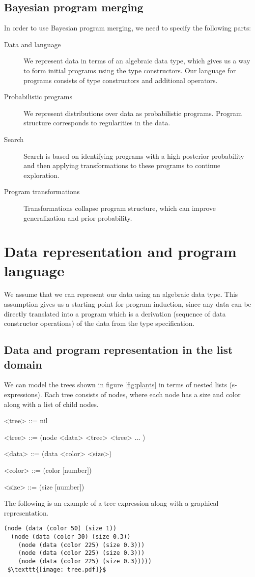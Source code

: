 \documentclass[a4paper,10pt]{article}
\begin{document}
\subsection{Bayesian program merging}

In order to use Bayesian program merging, we need to specify the following parts:

\begin{description}
\item[Data and language] We represent data in terms of an algebraic data type, which gives us a way to form initial programs using the type constructors. Our language for programs consists of type constructors and additional operators.
\item[Probabilistic programs]  We represent distributions over data as probabilistic programs. Program structure corresponds to regularities in the data.
\item[Search] Search is based on identifying programs with a high posterior probability and then applying transformations to these programs to continue exploration.
\item[Program transformations] Transformations collapse program structure, which can improve  generalization and prior probability.
\end{description}


\newpage
\section{Data representation and program language}
We assume that we can represent our data using an algebraic data type. This assumption gives us a starting point for program induction, since any data can be directly translated into a program which is a derivation (sequence of data constructor operations) of the data from the type specification. 
\subsection{Data and program representation in the list domain}
We can model the trees shown in figure \ref{fig:plants} in terms of nested lists (s-expressions).  Each tree consists of nodes, where each node has a size and color along with a list of child nodes.
\begin{grammar}
<tree> ::= nil

<tree> ::= (node <data> <tree> <tree> ... )

<data> ::= (data <color> <size>)

<color> ::= (color [number])

<size> ::= (size [number])
\end{grammar}
The following is an example of a tree expression along with a graphical representation.
\lstset{basicstyle=\small\ttfamily, frameround=fttt, breaklines=true, language=Lisp, showstringspaces=false, breakatwhitespace=true}
\begin{lstlisting}[mathescape=true]
(node (data (color 50) (size 1))
  (node (data (color 30) (size 0.3))
    (node (data (color 225) (size 0.3)))
    (node (data (color 225) (size 0.3)))
    (node (data (color 225) (size 0.3)))))
 $\texttt{[image: tree.pdf]}$ 
\end{lstlisting}
\end{document}
